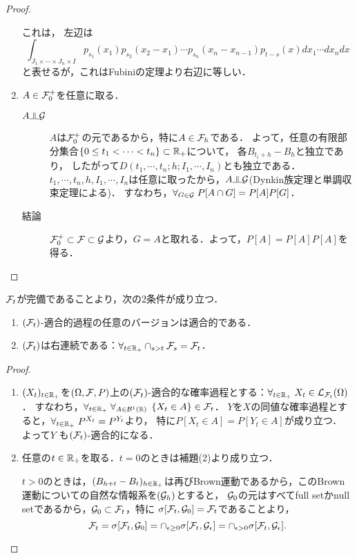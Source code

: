 \documentclass[uplatex,dvipdfmx]{jsreport}
\begin{document}
\begin{proof}
\begin{enumerate}
        これは，%
        左辺は
        \[\int_{J_1\times\cdots\times J_n\times I}p_{s_1}(x_1)p_{s_2}(x_2-x_1)\cdots p_{s_n}(x_n-x_{n-1})p_{t-s}(x)dx_1\cdots dx_ndx\]
        と表せるが，これはFubiniの定理より右辺に等しい．
        \item 
        $A\in\mathcal{F}^+_0$を任意に取る．
        \begin{description}
            \item[$A\indep\cG$] $A$は$\mathcal{F}^+_0$の元であるから，特に$A\in\mathcal{F}_h$である．
            よって，任意の有限部分集合$\{0\le t_1<\cdots<t_n\}\subset\mathbb{R}_+$について，
            各$B_{t_i+h}-B_{h}$と独立であり，
            したがって$D(t_1,\cdots,t_n;h;I_1,\cdots,I_n)$とも独立である．
            $t_1,\cdots,t_n,h,I_1,\cdots,I_n$は任意に取ったから，$A\indep\cG$(Dynkin族定理と単調収束定理による)．
            すなわち，$\forall_{G\in\mathcal{G}}\;P[A\cap G]=P[A]P[G]$．
            \item[結論] 
            $\mathcal{F}^+_0\subset\mathcal{F}\subset\mathcal{G}$より，$G=A$と取れる．よって，$P[A]=P[A]P[A]$を得る．
        \end{description}
    \end{enumerate}
\end{proof}

\begin{lemma}[自然な情報系の右連続性]
    $\mathcal{F}_t$が完備であることより，次の2条件が成り立つ．
    \begin{enumerate}
        \item $(\mathcal{F}_t)$-適合的過程の任意のバージョンは適合的である．
        \item $(\mathcal{F}_t)$は右連続である：$\forall_{t\in\mathbb{R}_+}\cap_{s>t}\mathcal{F}_s=\mathcal{F}_t$．
    \end{enumerate}
\end{lemma}
\begin{proof}\mbox{}
    \begin{enumerate}
        \item $(X_t)_{t\in\mathbb{R}_+}$を$(\Omega,\mathcal{F},P)$上の$(\mathcal{F}_t)$-適合的な確率過程とする：$\forall_{t\in\mathbb{R}_+}\;X_t\in\mathcal{L}_{\mathcal{F}_t}(\Omega)$．
        すなわち，$\forall_{t\in\mathbb{R}_+}\;\forall_{A\in\mathcal{B}^1(\mathbb{R})}\;\left\{X_t\in A\right\}\in\mathcal{F}_t$．
        $Y$を$X$の同値な確率過程とすると，$\forall_{t\in\mathbb{R}_+}\;P^{X_t}=P^{Y_t}$より，
        特に$P[X_t\in A]=P[Y_t\in A]$が成り立つ．
        よって$Y$
        も$(\mathcal{F}_t)$-適合的になる．
        \item 
        任意の$t\in\mathbb{R}_+$を取る．$t=0$のときは補題(2)より成り立つ．

        $t>0$のときは，$(B_{h+t}-B_t)_{h\in\mathbb{R}_+}$は再びBrown運動であるから，このBrown運動についての自然な情報系を$(\mathcal{G}_h)$とすると，
        $\mathcal{G}_0$の元はすべてfull setかnull setであるから，$\mathcal{G}_0\subset\mathcal{F}_t$，特に
        $\sigma[\mathcal{F}_t,\mathcal{G}_0]=\mathcal{F}_t$であることより，
        \[\mathcal{F}_t=\sigma[\mathcal{F}_t,\mathcal{G}_0]=\cap_{\epsilon\ge0}\sigma[\mathcal{F}_t,\mathcal{G}_\epsilon]=\cap_{\epsilon>0}\sigma[\mathcal{F}_t,\mathcal{G}_\epsilon].\]
    \end{enumerate}
\end{proof}
\end{document}
